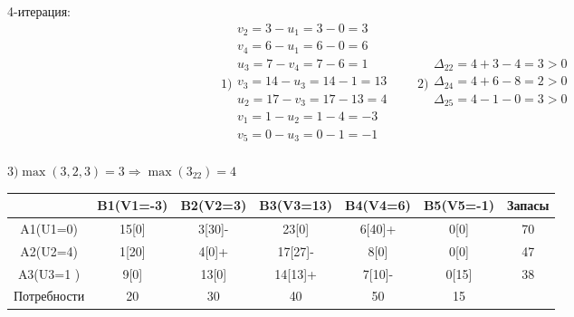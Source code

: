 \documentclass[a4paper, 12pt]{article}
\begin{document}
4-итерация:\\
\begin{equation*}
  1)\begin{split}
    v_2= 3 - u_1 = 3-0 = 3\\
    v_4= 6 - u_1 = 6-0 = 6\\
    u_3= 7 - v_4 = 7-6 = 1\\
    v_3= 14 - u_3 = 14-1 = 13\\
    u_2= 17 - v_3 = 17-13 = 4\\
    v_1= 1 - u_2 = 1-4 = -3\\
    v_5= 0 - u_3 = 0-1 = -1\\
  \end{split}
  \qquad  
  2)\begin{split}
    \Delta_{22} =4+3-4=3> 0 \\
    \Delta_{24} =4+6-8=2> 0 \\
    \Delta_{25} =4-1-0=3> 0 \\
  \end{split}
\end{equation*}

\begin{math}
  3) \max(3,2,3)= 3 \Rightarrow \max(3_{22}) = 4
\end{math}
\begin{table}[H]
\centering
\begin{tabular}{|c|c|c|c|c|c|c|}
\hline
            & B1(V1=-3)& B2(V2=3) & B3(V3=13) & B4(V4=6)  & B5(V5=-1) & Запасы \\ \hline
A1(U1=0)    & 15[0]    & 3[30]-   & 23[0]     & 6[40]+    & 0[0]      & 70     \\ \hline
A2(U2=4)    & 1[20]    & 4[0]+    & 17[27]-   & 8[0]      & 0[0]      & 47     \\ \hline
A3(U3=1 )   & 9[0]     & 13[0]    & 14[13]+   & 7[10]-    & 0[15]     & 38     \\ \hline
Потребности & 20       & 30       & 40        & 50        & 15        &        \\ \hline
\end{tabular}
\end{table}
\end{document}
